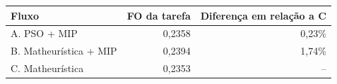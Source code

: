 \begin{tabular}{lrr}
\toprule
Fluxo & FO da tarefa & Diferença em relação a C \\
\midrule
A. PSO + MIP & 0,2358 & 0,23\% \\
B. Matheurística + MIP & 0,2394 & 1,74\% \\
C. Matheurística & 0,2353 & -- \\
\bottomrule
\end{tabular}
